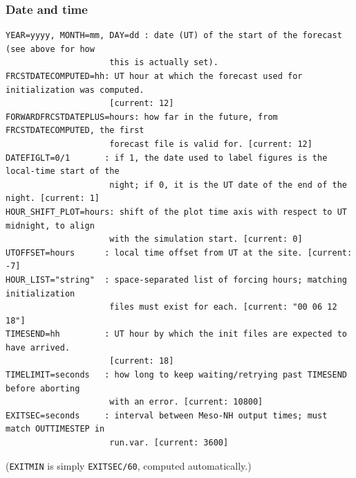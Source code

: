 \subsubsection{Date and time}
\begin{lstlisting}
YEAR=yyyy, MONTH=mm, DAY=dd : date (UT) of the start of the forecast (see above for how
                     this is actually set).
FRCSTDATECOMPUTED=hh: UT hour at which the forecast used for initialization was computed.
                     [current: 12]
FORWARDFRCSTDATEPLUS=hours: how far in the future, from FRCSTDATECOMPUTED, the first
                     forecast file is valid for. [current: 12]
DATEFIGLT=0/1       : if 1, the date used to label figures is the local-time start of the
                     night; if 0, it is the UT date of the end of the night. [current: 1]
HOUR_SHIFT_PLOT=hours: shift of the plot time axis with respect to UT midnight, to align
                     with the simulation start. [current: 0]
UTOFFSET=hours      : local time offset from UT at the site. [current: -7]
HOUR_LIST="string"  : space-separated list of forcing hours; matching initialization
                     files must exist for each. [current: "00 06 12 18"]
TIMESEND=hh         : UT hour by which the init files are expected to have arrived.
                     [current: 18]
TIMELIMIT=seconds   : how long to keep waiting/retrying past TIMESEND before aborting
                     with an error. [current: 10800]
EXITSEC=seconds     : interval between Meso-NH output times; must match OUTTIMESTEP in
                     run.var. [current: 3600]
\end{lstlisting}
(\texttt{EXITMIN} is simply \texttt{EXITSEC/60}, computed automatically.)

